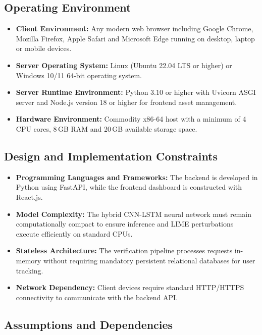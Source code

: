 \documentclass[12pt,a4paper,oneside]{report}
\begin{document}
\subsection{Operating Environment}

\begin{itemize}[leftmargin=*, itemsep=2pt]
  \item \textbf{Client Environment:} Any modern web browser including Google Chrome, Mozilla
        Firefox, Apple Safari and Microsoft Edge running on desktop, laptop or mobile devices.
  \item \textbf{Server Operating System:} Linux (Ubuntu 22.04 LTS or higher) or Windows 10/11
        64-bit operating system.
  \item \textbf{Server Runtime Environment:} Python 3.10 or higher with Uvicorn ASGI server and
        Node.js version 18 or higher for frontend asset management.
  \item \textbf{Hardware Environment:} Commodity x86-64 host with a minimum of 4 CPU cores, 8\,GB
        RAM and 20\,GB available storage space.
\end{itemize}

\subsection{Design and Implementation Constraints}

\begin{itemize}[leftmargin=*, itemsep=2pt]
  \item \textbf{Programming Languages and Frameworks:} The backend is developed in Python using
        FastAPI, while the frontend dashboard is constructed with React.js.
  \item \textbf{Model Complexity:} The hybrid CNN-LSTM neural network must remain computationally
        compact to ensure inference and LIME perturbations execute efficiently on standard CPUs.
  \item \textbf{Stateless Architecture:} The verification pipeline processes requests in-memory
        without requiring mandatory persistent relational databases for user tracking.
  \item \textbf{Network Dependency:} Client devices require standard HTTP/HTTPS connectivity to
        communicate with the backend API.
\end{itemize}

\subsection{Assumptions and Dependencies}
\end{document}
